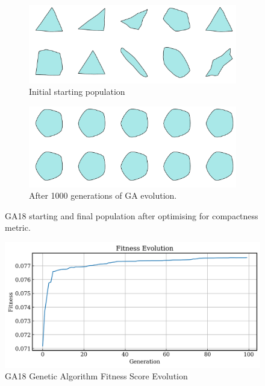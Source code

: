 \documentclass{article}
\begin{document}
\begin{figure}[H]
    \centering
    \begin{subfigure}[b]{0.45\textwidth}
        \centering
        \includegraphics[width=\textwidth]{figures/GAResults/GA18/init_pop10.png}
        \caption{Initial starting population}
        \label{fig:GA18_starting}
    \end{subfigure}
    \hfill
    \begin{subfigure}[b]{0.45\textwidth}
        \centering
        \includegraphics[width=\textwidth]{figures/GAResults/GA18/final_pop10.png}
        \caption{After 1000 generations of GA evolution.}
        \label{fig:GA18_final}
    \end{subfigure}
    \caption{GA18 starting and final population after optimising for compactness metric.}
    \label{fig:GA18_before_after_GA}
\end{figure}

\begin{figure}[H]
    \centering
    \includegraphics[width=0.75\linewidth]{figures/GAResults/GA18/10gen_fitness.png}
    \caption{GA18 Genetic Algorithm Fitness Score Evolution}
    \label{fig:GA18_fitness}
\end{figure}
\end{document}
